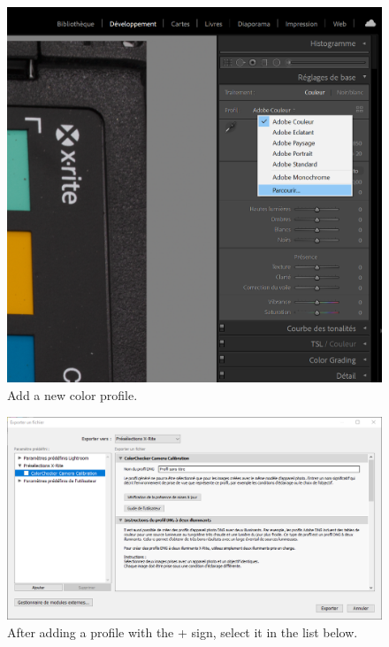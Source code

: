 \documentclass[
]{book}
\begin{document}
\begin{figure}

{\centering \includegraphics[width=0.8\linewidth]{Figures/profil_capture_1} 

}

\caption{Add a new color profile.}\label{fig:addprofile}
\end{figure}

\begin{figure}

{\centering \includegraphics[width=0.8\linewidth]{Figures/x_rite_preselection} 

}

\caption{After adding a profile with the + sign, select it in the list below.}\label{fig:settingssynchronize}
\end{figure}
\end{document}
